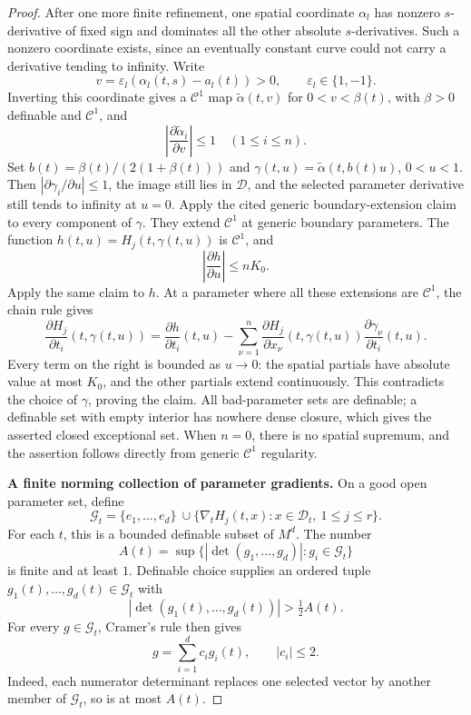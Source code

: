 \documentclass[11pt,a4paper]{article}
\theoremstyle{definition}
\begin{document}
\begin{proof}
After one more finite refinement, one spatial coordinate
\(\alpha_l\) has nonzero \(s\)-derivative of fixed sign and dominates
all the other absolute \(s\)-derivatives. Such a nonzero coordinate
exists, since an eventually constant curve could not carry a
derivative tending to infinity. Write
\[
 v=\varepsilon_l(\alpha_l(t,s)-a_l(t))>0,
 \qquad \varepsilon_l\in\{1,-1\}.
\]
Inverting this coordinate gives a \(\mathcal C^1\) map
\(\widetilde\alpha(t,v)\) for \(0<v<\beta(t)\), with \(\beta>0\)
definable and \(\mathcal C^1\), and
\[
 \left|\frac{\partial\widetilde\alpha_i}{\partial v}\right|
 \le1\quad(1\le i\le n).
\]
Set \(b(t)=\beta(t)/(2(1+\beta(t)))\) and
\(\gamma(t,u)=\widetilde\alpha(t,b(t)u)\), \(0<u<1\).
Then \(|\partial\gamma_i/\partial u|\le1\), the image still lies in
\(\mathcal D\), and the selected parameter derivative still tends
to infinity at \(u=0\). Apply the cited generic boundary-extension
claim to every component of \(\gamma\). They extend
\(\mathcal C^1\) at generic boundary parameters. The function
\(h(t,u)=H_j(t,\gamma(t,u))\) is \(\mathcal C^1\), and
\[
 \left|\frac{\partial h}{\partial u}\right|\le nK_0.
\]
Apply the same claim to \(h\). At a parameter where all these
extensions are \(\mathcal C^1\), the chain rule gives
\begin{equation}
 \frac{\partial H_j}{\partial t_i}(t,\gamma(t,u))
 =
 \frac{\partial h}{\partial t_i}(t,u)
 -\sum_{\nu=1}^n
   \frac{\partial H_j}{\partial x_\nu}(t,\gamma(t,u))
   \frac{\partial\gamma_\nu}{\partial t_i}(t,u).
 \label{equation-42}
\end{equation}
Every term on the right is bounded as \(u\to0\): the spatial
partials have absolute value at most \(K_0\), and the other
partials extend continuously. This contradicts the choice of
\(\gamma\), proving the claim. All bad-parameter sets are definable;
a definable set with empty interior has nowhere dense closure,
which gives the asserted closed exceptional set. When \(n=0\),
there is no spatial supremum, and the assertion follows directly
from generic \(\mathcal C^1\) regularity.

\textbf{A finite norming collection of parameter gradients.}
On a good open parameter set, define
\[
 \mathcal G_t=
 \{e_1,\ldots,e_d\}
 \ \cup
 \{\nabla_tH_j(t,x):x\in\mathcal D_t,\ 1\le j\le r\}.
\]
For each \(t\), this is a bounded definable subset of \(M^d\).
The number
\[
 A(t)=\sup\{|\det(g_1,\ldots,g_d)|:g_i\in\mathcal G_t\}
\]
is finite and at least \(1\). Definable choice supplies an ordered
tuple \(g_1(t),\ldots,g_d(t)\in\mathcal G_t\) with
\begin{equation}
 |\det(g_1(t),\ldots,g_d(t))|>\tfrac12 A(t).
 \label{equation-43}
\end{equation}
For every \(g\in\mathcal G_t\), Cramer's rule then gives
\begin{equation}
 g=\sum_{i=1}^d c_i g_i(t),\qquad |c_i|\le2.
 \label{equation-44}
\end{equation}
Indeed, each numerator determinant replaces one selected vector
by another member of \(\mathcal G_t\), so is at most \(A(t)\).


\end{proof}
\end{document}

